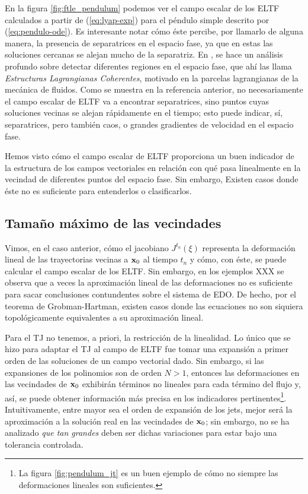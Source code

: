 En la figura \ref{fig:ftle_pendulum} podemos ver el campo escalar de los ELTF calculados a partir de (\ref{eq:lyap-exp}) para el péndulo simple descrito por (\ref{eq:pendulo-ode}). Es interesante notar cómo éste percibe, por llamarlo de alguna manera, la presencia de separatrices en el espacio fase, ya que en estas las soluciones cercanas se alejan mucho de la separatriz. En \cite{Haller2011}, se hace un análisis profundo sobre detectar diferentes regiones en el espacio fase, que ahí las llama \textit{Estructuras Lagrangianas Coherentes}, motivado en la parcelas lagrangianas de la mecánica de fluidos. Como se muestra en la referencia anterior, no necesariamente el campo escalar de ELTF va a encontrar separatrices, sino puntos cuyas soluciones vecinas se alejan rápidamente en el tiempo; esto puede indicar, sí, separatrices, pero también caos, o grandes gradientes de velocidad en el espacio fase.

Hemos visto cómo el campo escalar de ELTF proporciona un buen indicador de la estructura de los campos vectoriales en relación con qué pasa linealmente en la vecindad de diferentes puntos del espacio fase. Sin embargo, Existen casos donde éste no es suficiente para entenderlos o clasificarlos. 

\subsection{Tamaño máximo de las vecindades}

Vimos, en el caso anterior, cómo el jacobiano $J^{t_n}(\xi)$ representa la deformación lineal de las trayectorias vecinas a $\mathbf{x}_0$ al tiempo $t_n$ y cómo, con éste, se puede calcular el campo escalar de los ELTF. Sin embargo, en los ejemplos XXX se observa que a veces la aproximación lineal de las deformaciones no es suficiente para sacar conclusiones contundentes sobre el sistema de EDO. De hecho, por el teorema de Grobman-Hartman, existen casos donde las ecuaciones no son siquiera topológicamente equivalentes a su aproximación lineal. 

Para el TJ no tenemos, a priori, la restricción de la linealidad. Lo único que se hizo para adaptar el TJ al campo de ELTF fue tomar una expansión a primer orden de las soluciones de un campo vectorial dado. Sin embargo, si las expansiones de los polinomios son de orden $N > 1$, entonces las deformaciones en las vecindades de $\mathbf{x}_0$ exhibirán términos no lineales para cada término del flujo y, así, se puede obtener información más precisa en los indicadores pertinentes\footnote{La figura \ref{fig:pendulum_jt} es un buen ejemplo de cómo no siempre las deformaciones lineales son suficientes.}. Intuitivamente, entre mayor sea el orden de expansión de los jets, mejor será la aproximación a la solución real en las vecindades de $\mathbf{x}_0$; sin embargo, no se ha analizado \textit{que tan grandes} deben ser dichas variaciones para estar bajo una tolerancia controlada.

